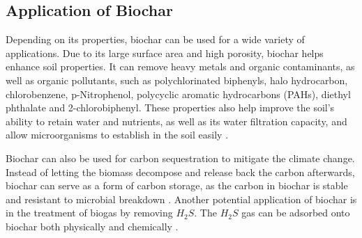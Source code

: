\subsection{Application of Biochar}
Depending on its properties, biochar can be used for a wide variety of applications. Due to its large surface area and high porosity, biochar helps enhance soil properties. It can remove heavy metals and organic contaminants, as well as organic pollutants, such as polychlorinated biphenyls, halo hydrocarbon, chlorobenzene, p-Nitrophenol, polycyclic aromatic hydrocarbons (PAHs), diethyl phthalate and 2-chlorobiphenyl. These properties also help improve the soil's ability to retain water and nutrients, as well as its water filtration capacity, and allow microorganisms to establish in the soil easily \cite{Yadav2023Biochar}.

\vspace{0.3em}

Biochar can also be used for carbon sequestration to mitigate the climate change. Instead of letting the biomass decompose and release back the carbon afterwards, biochar can serve as a form of carbon storage, as the carbon in biochar is stable and resistant to microbial breakdown \cite{Yadav2023Biochar}. Another potential application of biochar is in the treatment of biogas by removing $H_2S$. The $H_2S$ gas can be adsorbed onto biochar both physically and chemically \cite{Vuppaladadiyam2024BiocharHydrochar}.